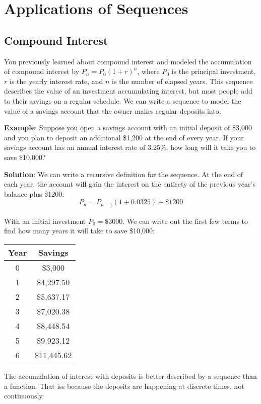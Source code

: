 \section{Applications of Sequences}
\subsection{Compound Interest}
You previously learned about compound interest and modeled the accumulation of 
compound interest by $P_n = P_0(1 + r)^n$, where $P_0$ is the principal 
investment, $r$ is the yearly interest rate, and $n$ is the number of elapsed 
years. This sequence describes the value of an investment accumulating 
interest, but most people add to their savings on a regular schedule. We can 
write a sequence to model the value of a savings account that the owner makes 
regular deposits into. 

\textbf{Example}: Suppose you open a savings account with an initial deposit 
of \$3,000 and you plan to deposit an additional \$1,200 at the end of every 
year. If your savings account has an annual interest rate of 3.25\%, how long 
will it take you to save \$10,000?

\textbf{Solution}: We can write a recursive definition for the sequence. At 
the end of each year, the account will gain the interest on the entirety of 
the previous year's balance plus \$1200:
$$P_n = P_{n-1}(1+0.0325) + \$1200$$\\
With an initial investment $P_0 = \$3000$. We can write out the first few terms 
to find how many years it will take to save \$10,000:
\begin{center}
\begin{tabular}{|c|c|}\hline
Year & Savings\\
\hline
0 & \$3,000\\
\hline
1 & \$4,297.50\\
\hline
2 & \$5,637.17\\
\hline
3 & \$7,020.38\\
\hline
4 & \$8,448.54\\
\hline
5 & \$9.923.12\\
\hline
6 & \$11,445.62\\
\hline
\end{tabular}
\end{center}

The accumulation of interest with deposits is better described by a sequence than a function. That iss because the deposits are happening at discrete times, not continuously. 

